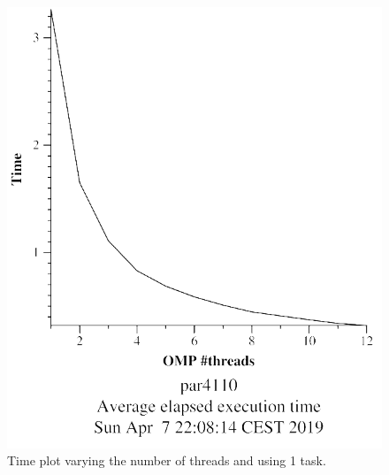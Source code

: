 \documentclass[12pt, a4paper]{article}
\begin{document}
\begin{figure}[H]
\begin{minipage}[t]{0.48\linewidth}
  \centering
  \includegraphics[scale=0.5]{./mandel-omp-10000-strong-omp-24-1-time}
  \caption{Time plot varying the number of threads and using 1 task.}
  \label{fig:mandel-omp-10000-strong-omp-24-1-time}
\end{minipage}%
\hspace{0.5cm}
\begin{minipage}[t]{0.48\linewidth}
  \centering

\end{minipage}
\end{figure}
\end{document}
